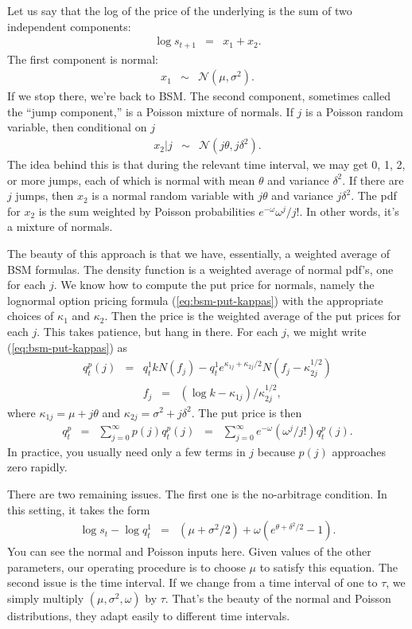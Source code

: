 \documentclass[11pt]{article}
\begin{document}
Let us say that the log of the price of the underlying is the sum
of two independent components:
\begin{eqnarray*}
    \log s_{t+1} &=& x_1 + x_2 .
\end{eqnarray*}
The first component is normal:
\begin{eqnarray*}
    x_1 &\sim& \mathcal{N}(\mu, \sigma^2) .
\end{eqnarray*}
If we stop there, we're back to BSM.
The second component, sometimes called the ``jump component,'' is a Poisson mixture of normals.
If $j$ is a Poisson random variable, then conditional on $j$
\begin{eqnarray*}
    x_2 | j &\sim& \mathcal{N}(j\theta, j\delta^2) .
\end{eqnarray*}
The idea behind this is that during the relevant time interval,
we may get 0, 1, 2, or more jumps, each of which is normal
with mean $\theta$ and variance $\delta^2$.
If there are $j$ jumps, then $x_2$ is
a normal random variable with $j\theta$ and variance $j\delta^2$.
The pdf for $x_2$ is the sum weighted
by Poisson probabilities $e^{-\omega} \omega^j / j!$.
In other words, it's a mixture of normals.

The beauty of this approach is that we have, essentially, a weighted average
of BSM formulas.
The density function is a weighted average of normal pdf's, one for each $j$.
We know how to compute the put price for normals,
namely the lognormal option pricing formula (\ref{eq:bsm-put-kappas})
with the appropriate choices of $\kappa_1$ and $\kappa_2$.
Then the price is the weighted average of the put prices for each $j$.
This takes patience, but hang in there.
For each $j$, we might write (\ref{eq:bsm-put-kappas}) as
\begin{eqnarray*}
    q^p_t(j) &=& q^1_t k N (f_j) - q^1_t e^{\kappa_{1j} + \kappa_{2j}/2}
            N ( f_j - \kappa_{2j}^{1/2} ) \\
     &&  f_j \;\;=\;\; (\log k - \kappa_{1j})/\kappa_{2j}^{1/2} ,
\end{eqnarray*}
where $\kappa_{1j} = \mu + j \theta $ and $\kappa_{2j} = \sigma^2 + j \delta^2$.
The put price is then
\begin{eqnarray*}
    q^p_t &=& \sum_{j=0}^\infty p(j) q^p_t(j)
            \;\;=\;\; \sum_{j=0}^\infty e^{-\omega} (\omega^j / j!) q^p_t(j) .
\end{eqnarray*}
In practice, you usually need only a few terms in $j$ because $p(j)$
approaches zero rapidly.


There are two remaining issues.
The first one is the no-arbitrage condition.
In this setting, it takes the form
\begin{eqnarray*}
    \log s_t - \log q^1_t &=& \left(\mu + \sigma^2/2 \right)
            + \omega \left( e^{\theta+\delta^2/2} - 1 \right) .
\end{eqnarray*}
You can see the normal and Poisson inputs here.
Given values of the other parameters, our operating procedure is
to choose $\mu$ to satisfy this equation.
The second issue is the time interval.
If we change from a time interval of one to $\tau$, we simply multiply
$(\mu, \sigma^2, \omega)$ by $\tau$.
That's the beauty of the normal and Poisson distributions,
they adapt easily to different time intervals.
\end{document}
